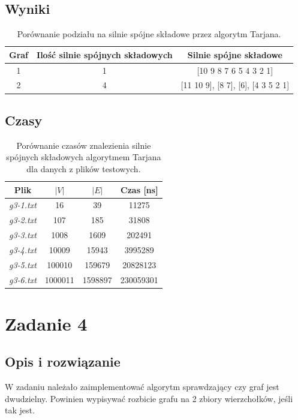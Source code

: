 \documentclass{article}
\begin{document}
\subsection{Wyniki}
\begin{table}[H]
\begin{adjustbox}{center}
\begin{tabular}{|c|c|c|}
    \hline
    Graf & Ilość silnie spójnych składowych & Silnie spójne składowe\\
    \hline
    1 & 1 & [10 9 8 7 6 5 4 3 2 1]\\
    \hline
    2 & 4 & [11 10 9], [8 7], [6], [4 3 5 2 1]\\
    \hline
\end{tabular}
\end{adjustbox}
\caption{Porównanie podziału na silnie spójne składowe przez algorytm Tarjana.}
\end{table}

\subsection{Czasy}
\begin{table}[H]
\begin{adjustbox}{center}
\begin{tabular}{|c|c|c|c|}
    \hline
    Plik & $|V|$ & $|E|$ & Czas [ns]\\
    \hline
    \textit{g3-1.txt} & 16 & 39 & 11275\\
    \hline
    \textit{g3-2.txt} & 107 & 185 & 31808\\
    \hline
    \textit{g3-3.txt} & 1008 & 1609 & 202491\\
    \hline
    \textit{g3-4.txt} & 10009 & 15943 & 3995289\\
    \hline
    \textit{g3-5.txt} & 100010 & 159679 & 20828123\\
    \hline
    \textit{g3-6.txt} & 1000011 & 1598897 & 230059301\\
    \hline
\end{tabular}
\end{adjustbox}
\caption{Porównanie czasów znalezienia silnie spójnych składowych algorytmem Tarjana dla danych z plików testowych.}
\end{table}

\section{Zadanie 4}
\subsection{Opis i rozwiązanie}
W zadaniu należało zaimplementować algorytm sprawdzający czy graf jest dwudzielny. Powinien wypisywać rozbicie grafu
na 2 zbiory wierzchołków, jeśli tak jest.
\end{document}
